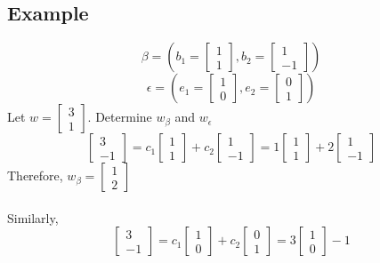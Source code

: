 \begin{enumerate}
\subsection{Example}
\[
  \beta = (b_1 = \begin{bmatrix} 1 \\ 1 \end{bmatrix}, b_2 = \begin{bmatrix} 1 \\ -1 \end{bmatrix})
\]
\[
  \epsilon = (e_1 = \begin{bmatrix} 1 \\ 0 \end{bmatrix}, e_2 = \begin{bmatrix} 0 \\ 1 \end{bmatrix})
\]
Let $w = \begin{bmatrix} 3 \\ 1 \end{bmatrix}$. Determine $w_{\beta}$ and $w_{\epsilon}$
\[
  \begin{bmatrix} 3 \\ -1 \end{bmatrix} = c_1\begin{bmatrix} 1 \\ 1 \end{bmatrix} + 
  c_2\begin{bmatrix} 1 \\ -1 \end{bmatrix} = 1\begin{bmatrix} 1 \\ 1 \end{bmatrix} + 
  2 \begin{bmatrix} 1 \\ -1 \end{bmatrix}
\] Therefore, $w_{\beta} = \begin{bmatrix} 1 \\ 2 \end{bmatrix}$ \\\\
Similarly, 
\[
  \begin{bmatrix} 3 \\ -1 \end{bmatrix} = c_1 \begin{bmatrix} 1 \\ 0 \end{bmatrix} + c_2 
  \begin{bmatrix} 0 \\ 1 \end{bmatrix} = 3 \begin{bmatrix} 1 \\ 0 \end{bmatrix} - 1 
\]
\end{enumerate}
